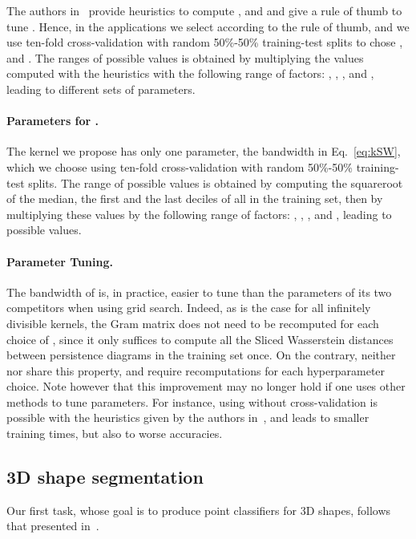\documentclass[11pt]{article}
\begin{document}
The authors in~\cite{Kusano16} provide heuristics to compute ,  and 
and give a rule of thumb to tune . Hence, in the applications we select  according to the rule of thumb, and
 we use ten-fold cross-validation with random 50\%-50\% training-test splits to chose ,  and . 
The ranges of possible values is obtained 
by multiplying the values computed with the heuristics
with the following range of  factors: , , ,  and ,
leading to  different sets of parameters. \\

\paragraph*{Parameters for .} The kernel we propose has only one parameter, the bandwidth  in Eq.~\ref{eq:kSW}, 
which we choose
using ten-fold cross-validation with random 50\%-50\% training-test splits. 
The range of possible values is obtained by computing the squareroot of the median, the first and the last deciles 
of all  in the training set,
then by multiplying these values by the following range of  factors: , , ,  and , 
leading to  possible values. 


\paragraph*{Parameter Tuning.} The bandwidth of  is, in practice, easier to tune than the parameters of its two competitors
when using grid search. Indeed, as is the case for all infinitely divisible kernels, the Gram matrix does not need to be 
recomputed for each choice of , since it only suffices to compute all the Sliced Wasserstein distances between persistence diagrams 
in the training set once. On the contrary, neither  nor  share this property, and require recomputations for each hyperparameter choice.
Note however that this improvement may no longer hold if one uses other methods to tune parameters.  
For instance, using  without cross-validation is possible with the heuristics given by the authors in~\cite{Kusano16}, 
and leads to smaller training times, but also to worse accuracies. 



\subsection{3D shape segmentation}
Our first task, whose goal is to produce point classifiers for 3D shapes, follows that presented in~\cite{Carriere15a}.
\end{document}
